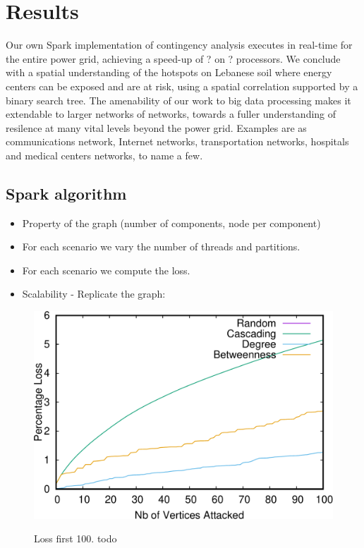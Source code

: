 \section{Results}
\label{results}
Our own Spark implementation of contingency analysis executes in real-time for the entire power grid, achieving a speed-up of ? on ? processors. We conclude with a spatial understanding of the hotspots on Lebanese soil where energy centers can be exposed and are at risk, using a spatial correlation supported by a binary search tree. The amenability of our work to big data processing makes it extendable to larger networks of networks, towards a fuller understanding of resilence at many vital levels beyond the power grid. Examples are as communications network, Internet networks, transportation networks, hospitals and medical centers networks, to name a few.

\subsection{Spark algorithm}

\begin{itemize}
\item Property of the graph (number of components, node per component)

\item For each scenario we vary the number of threads and partitions. 

\item For each scenario we compute the loss. 

\item Scalability - Replicate the graph:
\end{itemize}

\begin{figure}
\centering
\includegraphics[scale=0.35]{bench/loss-100-crop.pdf}
\label{fig:loss-100}
\caption{Loss first 100. todo}
\end{figure}

